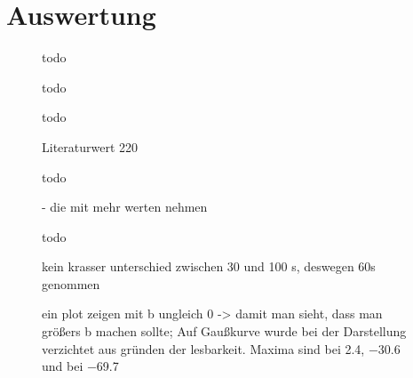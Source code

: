 \section{Auswertung}
\begin{figure}[H]
    \centering
    
    \caption{todo}
    \label{fig:Sonnenabbild}
\end{figure}

\begin{figure}[H]
    \centering
    
    \caption{todo}
    \label{fig:Sonnenkreuz_Az}
\end{figure}

\begin{figure}[H]
    \centering
    
    \caption{todo}
    \label{fig:Sonnenkreuz_Alt}
\end{figure}

\begin{figure}[H]
    \centering
    
    \caption{Literaturwert \SI{220}{} \cite{LSR}}
    \label{fig:VvonR}
\end{figure}

 \begin{figure}[H]
     \centering
     
     \caption{todo}
     \label{fig:Milchstrasse}
 \end{figure}

\begin{figure}[H]
    \centering
       
    \caption{- die mit mehr werten nehmen}
    \label{fig:Milchstrassesafe}
\end{figure}

\begin{figure}[H]
    \centering
       
    \caption{todo}
    \label{fig:Belichtungszeit}
\end{figure}

\begin{figure}[H]
    \centering
       
    \caption{kein krasser unterschied zwischen 30 und 100 s, deswegen 60s genommen}
    \label{fig:BelichtungszeitExtremal}
\end{figure}

\begin{figure}[H]
    \centering
       
    \caption{ein plot zeigen mit b ungleich 0 -> damit man sieht, dass man größers b machen sollte; Auf Gaußkurve wurde bei der Darstellung verzichtet aus gründen der lesbarkeit. Maxima sind bei \SI{2.4}{}, \SI{-30.6}{} und bei \SI{-69.7}{}}
    \label{fig:bungleichnull}
\end{figure}

